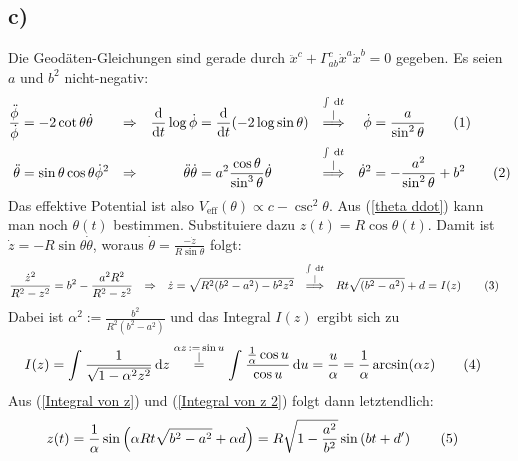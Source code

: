 \documentclass[a4paper,12pt]{article}
\newcommand\numberthis{\addtocounter{equation}{1}\tag{\theequation}}
\newcommand{\kom}{}
\newcommand{\intx}{}
\newcommand{\kla}{}
\newcommand{\tecxt}{}
\begin{document}
\subsection*{c)}Die Geodäten-Gleichungen sind gerade durch $\ddot{x}^c+\Gamma^c_{ab}\dot{x}^a\dot{x}^b=0$ gegeben. Es seien $a$ und $b^2$ nicht-negativ:
\begin{align*}
\frac{\ddot{\phi}}{\dot{\phi}}&=-2\cot\theta\dot{\theta}&\Rightarrow&&\frac{\tecxt\text{d}}{\tecxt\text{d}t}\log\dot{\phi}&=\frac{\tecxt\text{d}}{\tecxt\text{d}t}(-2\log\sin\theta)&\kom\overset{\substack{{\intx\int_{ }^{ }\,\mathrm{d}t} \\ |}}{\Longrightarrow} &&\dot{\phi}&=\frac{a}{\sin^2\theta}\numberthis\label{phi ddot}\\
\ddot{\theta}&=\sin\theta\cos\theta\dot{\phi}^2&\Rightarrow &&\ddot{\theta}\dot{\theta}&=a^2\frac{\cos\theta}{\sin^3\theta}\dot{\theta}&\kom\overset{\substack{{\intx\int_{ }^{ }\,\mathrm{d}t} \\ |}}{\Longrightarrow} &&\dot{\theta}^2&=-\frac{a^2}{\sin^2\theta}+b^2\numberthis\label{theta ddot}
\end{align*}
Das effektive Potential ist also $V_\tecxt\text{eff}(\theta)\propto c-\csc^2\theta$. Aus (\ref{theta ddot}) kann man noch $\theta(t)$ bestimmen. Substituiere dazu $z(t)=R\cos\theta(t)$. Damit ist $\dot{z}=-R\sin\theta\dot{\theta}$, woraus $\dot{\theta}=\frac{-\dot{z}}{R\sin\theta}$ folgt:
\begin{align*}
\frac{\dot{z}^2}{R^2-z^2}&=b^2-\frac{a^2R^2}{R^2-z^2}&\Rightarrow &&\dot{z}&=\sqrt{R^2(b^2-a^2)-b^2z^2}&\kom\overset{\substack{{\intx\int_{ }^{ }\,\mathrm{d}t} \\ |}}{\Longrightarrow} && Rt\sqrt{(b^2-a^2)}+d&=I(z)\numberthis\label{Integral von z}
\end{align*}
Dabei ist $\alpha^2:=\frac{b^2}{R^2(b^2-a^2)}$ und das Integral $I(z)$ ergibt sich zu
\begin{align*}
I(z)&=\intx\int_{ }^{ }\frac{1}{\sqrt{1-\alpha^2z^2}}\,\mathrm{d}z\kom\overset{\substack{{\alpha z\,:=\,\sin u} \\ |}}{=}\intx\int_{ }^{ }\frac{\frac{1}{\alpha}\cos u}{\cos u}\,\mathrm{d}u=\frac{u}{\alpha}=\frac{1}{\alpha}\arcsin(\alpha z)\numberthis\label{Integral von z 2}
\end{align*}
Aus (\ref{Integral von z}) und (\ref{Integral von z 2}) folgt dann letztendlich:
\begin{align*}
z(t)&=\frac{1}{\alpha}\sin\kla\left( {\alpha Rt\sqrt{b^2-a^2}+\alpha d} \right)=R\sqrt{1-\frac{a^2}{b^2}}\sin\kla\left( {bt+d'} \right)\numberthis\label{z von t}
\end{align*}
\end{document}
